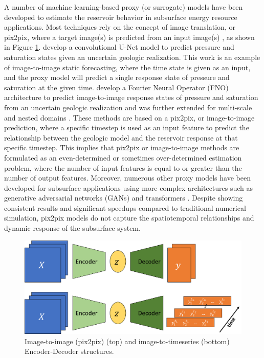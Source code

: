 \documentclass[10pt, twoside]{article}
\begin{document}
A number of machine learning-based proxy (or surrogate) models have been developed to estimate the reservoir behavior in subsurface energy resource applications. Most techniques rely on the concept of image translation, or pix2pix, where a target image(s) is predicted from an input image(s) \cite{Pan2021, Sebacher2022, Bao2022, Ronneberger2015}, as shown in Figure \ref{pix2N}. \citet{Maldonado2021Unet} develop a convolutional U-Net model to predict pressure and saturation states given an uncertain geologic realization. This work is an example of image-to-image static forecasting, where the time state is given as an input, and the proxy model will predict a single response state of pressure and saturation at the given time. \citet{WEN2022104180} develop a Fourier Neural Operator (FNO) architecture to predict image-to-image response states of pressure and saturation from an uncertain geologic realization and was further extended for multi-scale and nested domains \cite{Wen2023Operators}. These methods are based on a pix2pix, or image-to-image prediction, where a specific timestep is used as an input feature to predict the relationship between the geologic model and the reservoir response at that specific timestep. This implies that pix2pix or image-to-image methods are formulated as an even-determined or sometimes over-determined estimation problem, where the number of input features is equal to or greater than the number of output features. Moreover, numerous other proxy models have been developed for subsurface applications using more complex architectures such as generative adversarial networks (GANs) \cite{jo2021machine} and transformers \cite{zhang2023evaluating, zhang2023efficient}. Despite showing consistent results and significant speedups compared to traditional numerical simulation, pix2pix models do not capture the spatiotemporal relationships and dynamic response of the subsurface system.

\begin{figure}
    \centering
    \includegraphics[width=12cm]{figures/pix2N.png}
    \caption{Image-to-image (pix2pix) (top) and image-to-timeseries (bottom) Encoder-Decoder structures.}
    \label{pix2N}
\end{figure}
\end{document}
